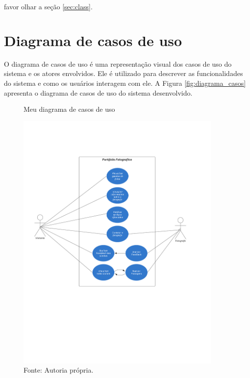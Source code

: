 favor olhar a seção \ref{sec:class}.


\section{Diagrama de casos de uso}
\label{sec:casos}
O diagrama de casos de uso é uma representação visual dos casos de uso do sistema e os atores envolvidos. Ele é utilizado para descrever as funcionalidades do sistema e como os usuários interagem com ele. A Figura \ref{fig:diagrama_casos} apresenta o diagrama de casos de uso do sistema desenvolvido.
\begin{figure} [h!]
    \centering
    \caption{Meu diagrama de casos de uso}
    \includegraphics[width=0.9\textwidth]{Figures/Diagrama_de_caso_de_uso.png}
    \caption*{Fonte: Autoria própria.}
    \label{fig:diagrama_de_casos_de_uso}
\end{figure}

